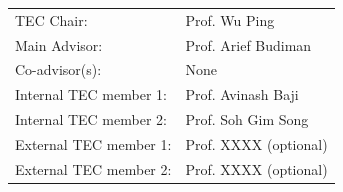 \documentclass[
11pt, %
oneside, %
english, %
singlespacing, %
headsepline, %
]{MastersDoctoralThesis} %
\begin{document}

\begin{tec}
	\addchaptertocentry{\tecname}
	\begin{tabular}{ll}
		TEC Chair:             & Prof. Wu Ping         \\
		Main Advisor:          & Prof. Arief Budiman   \\
		Co-advisor(s):         & None                  \\
		Internal TEC member 1: & Prof. Avinash Baji    \\
		Internal TEC member 2: & Prof. Soh Gim Song    \\
		External TEC member 1: & Prof. XXXX (optional) \\
		External TEC member 2: & Prof. XXXX (optional) \\
	\end{tabular}
\end{tec}

\end{document}
